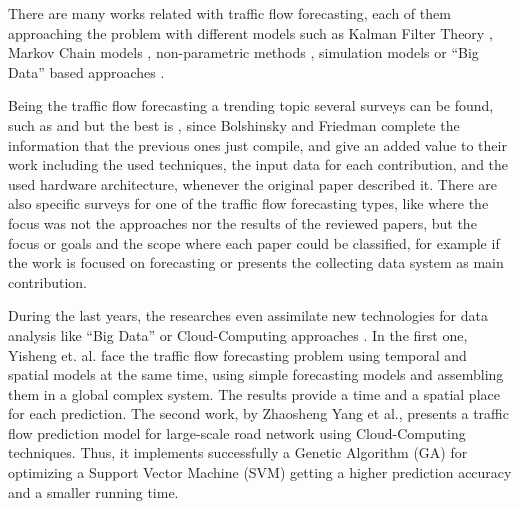 \documentclass[preprint]{elsarticle}
\begin{document}


There are many works related with traffic flow forecasting, each of them approaching the problem with different models \cite{SurveyKumar2007} such as Kalman Filter Theory \cite{ASJC:ASJC1051}, Markov Chain models \cite{Qi201495}, non-parametric methods \cite{Noparametrico2014}, simulation models \cite{simulaciontrafico2012} or ``Big Data'' based approaches \cite{SurveyKumar2007}.  %
%

Being the traffic flow forecasting a trending topic several surveys can be found, such as \cite{Survey2004} and \cite{SurveyKumar2007} but the best is \cite{SurveyBolshinsky2012}, since Bolshinsky and Friedman complete the information that the previous ones just compile, and give an added value to their work including the used techniques, the input data for each contribution, and the used hardware architecture, whenever the original paper described it. There are also specific surveys for one of the traffic flow forecasting types, like \cite{Vlahogianni2014} where the focus was not the approaches nor the results of the reviewed papers, but the focus or goals and the scope where each paper could be classified, for example if the work is focused on forecasting or presents the collecting data system as main contribution.



During the last years, the researches even assimilate new technologies
for data analysis like ``Big Data'' \cite{TrafficFlowPredictionWithBigData2015} or Cloud-Computing
approaches \citep{CloudComputing2014}. In the first one, Yisheng
et. al. face the traffic flow forecasting problem using temporal and
spatial models at the same time, using simple forecasting models and
assembling them in a global complex system. The results provide a time
and a spatial place for each prediction. The second work, by Zhaosheng
Yang et al., presents a traffic flow prediction model for large-scale
road network using Cloud-Computing techniques. Thus, it implements
successfully a Genetic Algorithm (GA) for optimizing a Support Vector
Machine (SVM) getting a higher prediction accuracy and a smaller
running time.  
\end{document}
